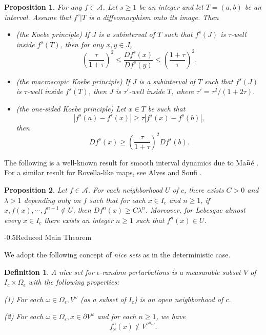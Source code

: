 \documentclass[11pt,oneside]{article}
\makeatletter
\newtheorem{definition}{Definition}[section]
\theoremstyle{plain}
\newtheorem{prop}{Proposition}
\numberwithin{equation}{section}
\numberwithin{figure}{section}
\numberwithin{table}{section}
\renewcommand{\subsection}{\@startsection{subsection}{1}{0mm}
{-\baselineskip}{0.5\baselineskip}{\large\bf\leftline}}
\makeatother
\begin{document}
\begin{prop}
For any $f \in \mathcal A$. Let $s \geq 1$ be an integer and let $T = (a, b)$ be an interval. Assume that $f^s|T$ is a diffeomorphism onto its image. Then


\begin{itemize}
\item[(1)] (the Koebe principle) If $J$ is a subinterval of $T$ such that $f^s(J)$ is $\tau$-well inside $f^s(T)$, then for any $x, y \in J$,
\[
\left( \frac{\tau}{1+\tau} \right)^2 \leq \frac{Df^s(x)}{Df^s(y)} \leq \left( \frac{1+\tau}{\tau} \right)^2.
\]
\item[(2)] (the macroscopic Koebe principle) If $J$ is a subinterval of $T$ such that $f^s(J)$ is $\tau$-well inside $f^s(T)$, then $J$ is $\tau'$-well inside $T$, where $\tau'=\tau^2/(1+2\tau)$.
\item[(3)] (the one-sided Koebe principle) Let $x \in T$ be such that 
\[
|f^s(a) - f^s(x)| \geq \tau |f^s(x) - f^s(b)|,
\]
then
\[
Df^s(x) \geq \left( \frac{\tau}{1+\tau} \right)^2 Df^s(b).
\]
\end{itemize}
\end{prop} 


The following is a well-known result for smooth interval dynamics due to Ma${\rm \tilde{n}}$\'e \cite{Ma}. For a similar result for Rovella-like maps, see Alves and Soufi \cite{AS}.


\begin{prop}
Let $f \in \mathcal A$. For each neighborhood $U$ of $c$, there exists $C>0$ and $\lambda > 1$ depending only on $f$ such that for each $x \in I_c$ and $n \geq 1$, if $x, f(x), \cdots, f^{n-1} \notin U$, then $Df^n(x) \geq C \lambda ^n$. Moreover, for Lebesgue almost every $x \in I_c$ there exists an integer $n \geq 1$ such that $f^n(x) \in U$.
\end{prop}


\subsection{Reduced Main Theorem}

We adopt the following concept of {\it nice sets} as in the deterministic case.


\begin{definition}
A nice set for $\epsilon$-random perturbations is a measurable subset $V$ of $I_c \times \Omega_{\epsilon}$ with the following properties:

(1) For each $\omega \in \Omega_{\epsilon}, V^{\omega}$ (as a subset of $I_c$) is an open neighborhood of $c$.

(2) For each $\omega \in \Omega_{\epsilon}, x \in \partial V^{\omega}$  and for each $ n \geq 1$, we have
\[
f_{\omega}^n(x) \notin V^{\sigma^n \omega}.
\]
\end{definition}
\end{document}
